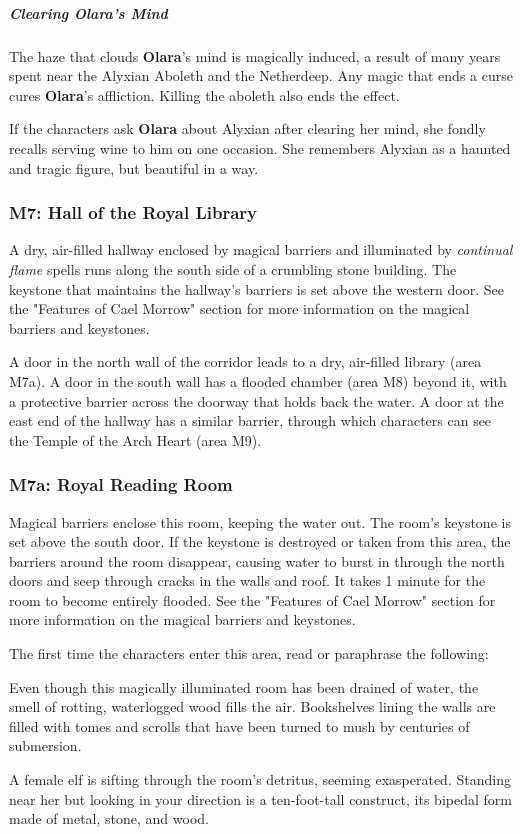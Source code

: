 \documentclass[10pt,a4paper,twoside,fancy,bg=print,twocolumn,openany,nodeprecatedcode]{dndbook}
\begin{document}
\subparagraph{Clearing Olara's Mind}
The haze that clouds \textbf{Olara}'s mind is magically induced, a result of many years spent near the Alyxian Aboleth and the Netherdeep. Any magic that ends a curse cures \textbf{Olara}'s affliction. Killing the aboleth also ends the effect.

If the characters ask \textbf{Olara} about Alyxian after clearing her mind, she fondly recalls serving wine to him on one occasion. She remembers Alyxian as a haunted and tragic figure, but beautiful in a way.

\subsubsection{M7: Hall of the Royal Library}
A dry, air-filled hallway enclosed by magical barriers and illuminated by \textit{continual flame} spells runs along the south side of a crumbling stone building. The keystone that maintains the hallway's barriers is set above the western door. See the "Features of Cael Morrow" section for more information on the magical barriers and keystones.

A door in the north wall of the corridor leads to a dry, air-filled library (area M7a). A door in the south wall has a flooded chamber (area M8) beyond it, with a protective barrier across the doorway that holds back the water. A door at the east end of the hallway has a similar barrier, through which characters can see the Temple of the Arch Heart (area M9).

\subsubsection{M7a: Royal Reading Room}
Magical barriers enclose this room, keeping the water out. The room's keystone is set above the south door. If the keystone is destroyed or taken from this area, the barriers around the room disappear, causing water to burst in through the north doors and seep through cracks in the walls and roof. It takes 1 minute for the room to become entirely flooded. See the "Features of Cael Morrow" section for more information on the magical barriers and keystones.

The first time the characters enter this area, read or paraphrase the following:

\begin{DndReadAloud}{}
Even though this magically illuminated room has been drained of water, the smell of rotting, waterlogged wood fills the air. Bookshelves lining the walls are filled with tomes and scrolls that have been turned to mush by centuries of submersion.

A female elf is sifting through the room's detritus, seeming exasperated. Standing near her but looking in your direction is a ten-foot-tall construct, its bipedal form made of metal, stone, and wood.

\end{DndReadAloud}
\end{document}
